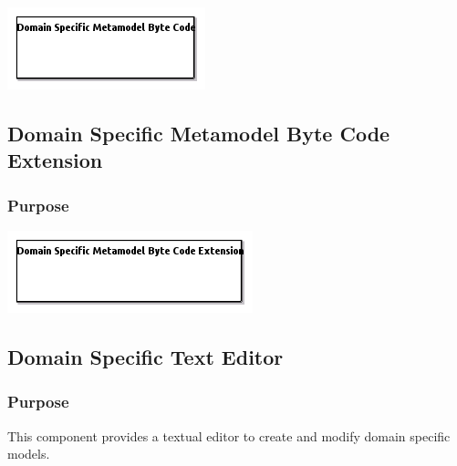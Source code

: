 \documentclass{gemoc} %
\begin{document}

\begin{center}
\includegraphics*[trim=0.0cm 0.0cm 0cm 0.0cm, clip=true]{../images/generated/Generated_Domain_Specific_Metamodel_Byte_Code.png}
\end{center}




\subsection{Domain Specific Metamodel Byte Code Extension}


\subsubsection{Purpose}


\begin{center}
\includegraphics*[trim=0.0cm 0.0cm 0cm 0.0cm, clip=true]{../images/generated/Generated_Domain_Specific_Metamodel_Byte_Code_Extension.png}
\end{center}




\subsection{Domain Specific Text Editor}


\subsubsection{Purpose}
This component provides a textual editor to create and modify domain specific models.
\end{document}

